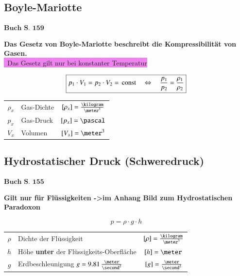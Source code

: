 \subsection{Boyle-Mariotte}	
\begin{flushright}
	$\boxed{\textbf{Buch S. 159}}$
\end{flushright}
\textbf{Das Gesetz von Boyle-Mariotte beschreibt die Kompressibilität von Gasen.} \\
\colorbox{violet}{ \textrightarrow\ Das Gesetz gilt nur bei konstanter Temperatur} 

$$ \boxed{ p_1 \cdot V_1 = p_2 \cdot V_2 = \, \mathop{} \! \mathrm{const} \quad \Leftrightarrow \quad \frac{p_1}{p_2} = \frac{\rho_1}{\rho_2} } $$ 

\renewcommand{\arraystretch}{1.3}
\begin{tabular}{c l c}
    $\rho_x$    & Gas-Dichte    & $[\rho_x] = \frac{\kilogram}{\meter^3}$   \\
    $p_x$       & Gas-Druck     & $[p_x] = \pascal $                        \\
    $V_x$       & Volumen       & $[V_x] = \meter^3$
\end{tabular}
\renewcommand{\arraystretch}{1}


\subsection{Hydrostatischer Druck (Schweredruck)}
\begin{flushright}
	$\boxed{\textbf{Buch S. 155}}$
\end{flushright}

\textbf{Gilt nur für Flüssigkeiten \newline ->im Anhang Bild zum Hydrostatischen Paradoxon} 

$$ \boxed{ p = \rho \cdot g \cdot h }$$	

\renewcommand{\arraystretch}{1.3}
\begin{tabular}{c l c}
    $\rho$  & Dichte der Flüssigkeit                                    & $[\rho] = \frac{\kilogram}{\meter^3}$ \\
    $h$     & Höhe \textbf{unter} der Flüssigkeits-Oberfläche           & $[h] = \meter$                        \\
    $g$     & Erdbeschleunigung $g = 9.81 \, \frac{\meter}{\second^2}$  & $[g] = \frac{\meter}{\second^2}$
\end{tabular}
\renewcommand{\arraystretch}{1}

\smallskip


